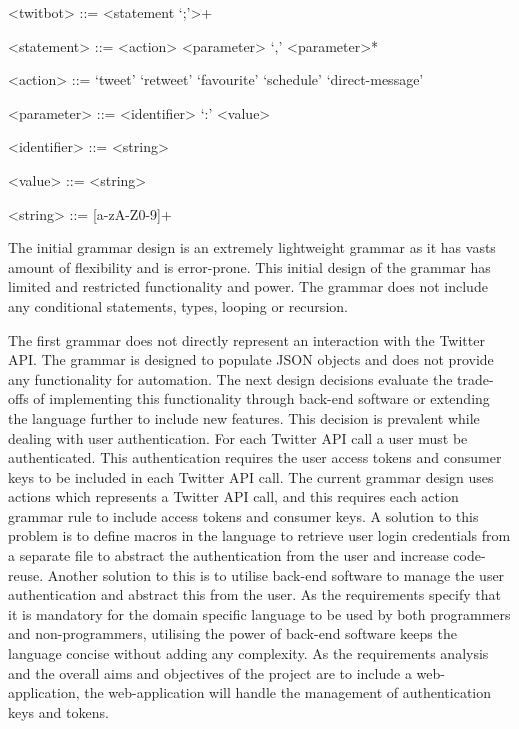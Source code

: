 \begin{grammar}
<twitbot> ::= <statement `;'>+

<statement> ::= <action> <parameter> `,' <parameter>*

<action> ::= `tweet' 
\alt `retweet'
\alt `favourite'
\alt `schedule'
\alt `direct-message'

<parameter> ::= <identifier> `:' <value>

<identifier> ::= <string>

<value> ::= <string>

<string> ::= [a-zA-Z0-9]+
\end{grammar}

The initial grammar design is an extremely lightweight grammar as it has vasts amount of flexibility and is error-prone. This initial design of the grammar has limited and restricted functionality and power. The grammar does not include any conditional statements, types, looping or recursion. \newline \par

The first grammar does not directly represent an interaction with the Twitter API. The grammar is designed to populate JSON objects and does not provide any functionality for automation. The next design decisions evaluate the trade-offs of implementing this functionality through back-end software or extending the language further to include new features. This decision is prevalent while dealing with user authentication. For each Twitter API call a user must be authenticated. This authentication requires the user access tokens and consumer keys to be included in each Twitter API call. The current grammar design uses actions which represents a Twitter API call, and this requires each action grammar rule to include access tokens and consumer keys. A solution to this problem is to define macros in the language to retrieve user login credentials from a separate file to abstract the authentication from the user and increase code-reuse. Another solution to this is to utilise back-end software to manage the user authentication and abstract this from the user. As the requirements specify that it is mandatory for the domain specific language to be used by both programmers and non-programmers, utilising the power of back-end software keeps the language concise without adding any complexity. As the requirements analysis and the overall aims and objectives of the project are to include a web-application, the web-application will handle the management of authentication keys and tokens. \newline \par


